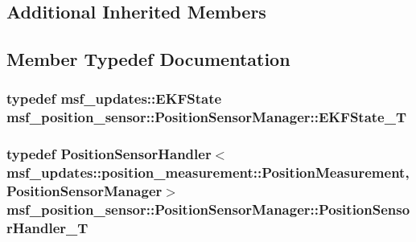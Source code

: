 \subsection*{Additional Inherited Members}


\subsection{Member Typedef Documentation}
\hypertarget{classmsf__position__sensor_1_1PositionSensorManager_abf67877833d9fa2ce0afda2fd8f92bae}{
\subsubsection[{E\-K\-F\-State\-\_\-\-T}]{\setlength{\rightskip}{0pt plus 5cm}typedef {\bf msf\-\_\-updates\-::\-E\-K\-F\-State} {\bf msf\-\_\-position\-\_\-sensor\-::\-Position\-Sensor\-Manager\-::\-E\-K\-F\-State\-\_\-\-T}}}\label{classmsf__position__sensor_1_1PositionSensorManager_abf67877833d9fa2ce0afda2fd8f92bae}
\hypertarget{classmsf__position__sensor_1_1PositionSensorManager_afd8d00f9745db7b1b5290f0613ca0eca}{
\subsubsection[{Position\-Sensor\-Handler\-\_\-\-T}]{\setlength{\rightskip}{0pt plus 5cm}typedef Position\-Sensor\-Handler$<$ msf\-\_\-updates\-::position\-\_\-measurement\-::\-Position\-Measurement, {\bf Position\-Sensor\-Manager}$>$ {\bf msf\-\_\-position\-\_\-sensor\-::\-Position\-Sensor\-Manager\-::\-Position\-Sensor\-Handler\-\_\-\-T}\hspace{0.3cm}{\ttfamily [private]}}}\label{classmsf__position__sensor_1_1PositionSensorManager_afd8d00f9745db7b1b5290f0613ca0eca}
